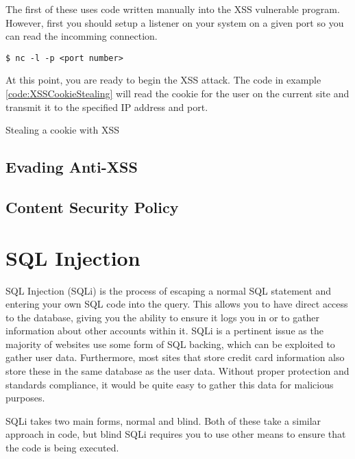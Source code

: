 				The first of these uses code written manually into the XSS vulnerable program. 
				However, first you should setup a listener on your system on a given port so you can read the incomming connection. 
				\begin{lstlisting}[style=CLI]
					$ nc -l -p <port number>
				\end{lstlisting}

				At this point, you are ready to begin the XSS attack. 
				The code in example \ref{code:XSSCookieStealing} will read the cookie for the user on the current site and transmit it to the specified IP address and port. 
				\begin{code}
					\centering
					
					\label{code:XSSCookieStealing}
					\caption{Stealing a cookie with XSS}
				\end{code}
					
		\subsection{Evading Anti-XSS}
		\subsection{Content Security Policy}
	\section{SQL Injection}
		SQL Injection (SQLi) is the process of escaping a normal SQL statement and entering your own SQL code into the query. 
		This allows you to have direct access to the database, giving you the ability to ensure it logs you in or to gather information about other accounts within it. 
		SQLi is a pertinent issue as the majority of websites use some form of SQL backing, which can be exploited to gather user data. 
		Furthermore, most sites that store credit card information also store these in the same database as the user data. 
		Without proper protection and standards compliance, it would be quite easy to gather this data for malicious purposes. 

		SQLi takes two main forms, normal and blind. 
		Both of these take a similar approach in code, but blind SQLi requires you to use other means to ensure that the code is being executed. 
